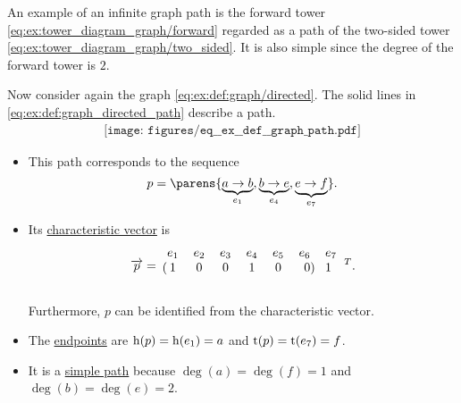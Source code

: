 \begin{example}\label{ex:def:graph_directed_path}
  An example of an infinite graph path is the forward tower \eqref{eq:ex:tower_diagram_graph/forward} regarded as a path of the two-sided tower \eqref{eq:ex:tower_diagram_graph/two_sided}. It is also simple since the degree of the forward tower is \( 2 \).

  Now consider again the graph \eqref{eq:ex:def:graph/directed}. The solid lines in \eqref{eq:ex:def:graph_directed_path} describe a path.
  \begin{equation}\label{eq:ex:def:graph_directed_path}
    \begin{aligned}
      \texttt{[image: figures/eq\_\_ex\_\_def\_\_graph\_path.pdf]}
    \end{aligned}
  \end{equation}

  \begin{itemize}
    \item This path corresponds to the sequence
    \begin{equation*}
      p = \parens{ \underbrace{a \to b}_{e_1}, \underbrace{b \to e}_{e_4}, \underbrace{e \to f}_{e_7} }.
    \end{equation*}

    \item Its \hyperref[def:graph_directed_path/characteristic_vector]{characteristic vector} is
    \begin{equation*}
      \vect{p}
      =
      \begin{blockarray}{cccccrl}
        e_1 & e_2 & e_3 & e_4 & e_5 & e_6 & e_7 \\
      \begin{block}{(cccccr)l}
        1   & 0   & 0   & 1   & 0   & 0   & 1 \\
      \end{block}
      \end{blockarray}
      {}^T.
    \end{equation*}

    Furthermore, \( p \) can be identified from the characteristic vector.

    \item The \hyperref[def:graph_directed_path/endpoints]{endpoints} are \( \operatorname{h}(p) = \operatorname{h}(e_1) = a \) and \( \operatorname{t}(p) = \operatorname{t}(e_7) = f \).

    \item It is a \hyperref[def:graph_adjacency_chain/simple]{simple path} because \( \deg(a) = \deg(f) = 1 \) and \( \deg(b) = \deg(e) = 2 \).


\end{itemize}
\end{example}
